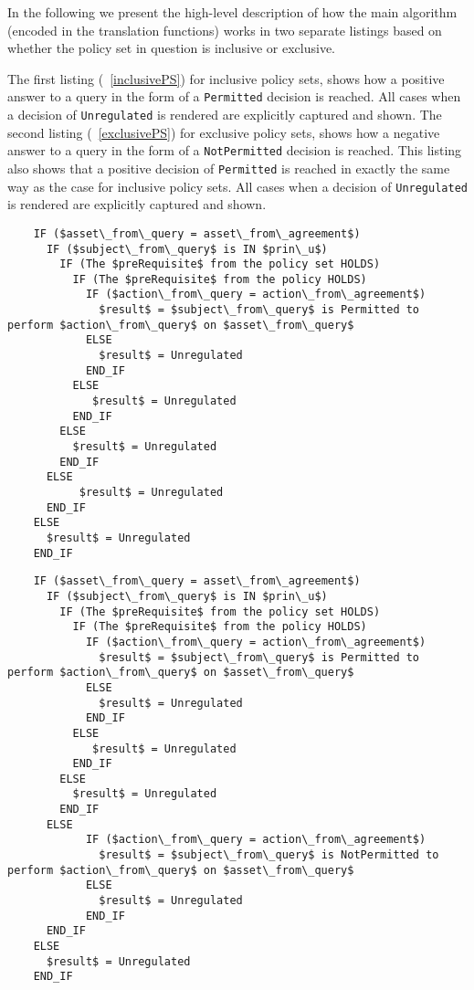 \documentclass[runningheads,a4paper]{llncs}
\newcommand{\syn}{\texttt}
\begin{document}
In the following we present the high-level description of how the main algorithm (encoded in the translation functions) works in two separate listings based on whether the policy set in question is inclusive or exclusive. 

The first listing (~\ref{inclusivePS}) for inclusive policy sets, shows how a positive answer to a query in the form of a \syn{Permitted} decision is reached. All cases when a decision of \syn{Unregulated} is rendered are explicitly captured and shown. The second listing (~\ref{exclusivePS}) for exclusive policy sets, shows how a negative answer to a query in the form of a \syn{NotPermitted} decision is reached. This listing also shows that a positive decision of \syn{Permitted} is reached in exactly the same way as the case for inclusive policy sets. All cases when a decision of \syn{Unregulated} is rendered are explicitly captured and shown.

\begin{lstlisting}
    IF ($asset\_from\_query = asset\_from\_agreement$)
      IF ($subject\_from\_query$ is IN $prin\_u$)
        IF (The $preRequisite$ from the policy set HOLDS)
          IF (The $preRequisite$ from the policy HOLDS)
            IF ($action\_from\_query = action\_from\_agreement$)
              $result$ = $subject\_from\_query$ is Permitted to perform $action\_from\_query$ on $asset\_from\_query$
            ELSE
              $result$ = Unregulated
            END_IF            
          ELSE
             $result$ = Unregulated
          END_IF
        ELSE
          $result$ = Unregulated
        END_IF
      ELSE
           $result$ = Unregulated
      END_IF
    ELSE
      $result$ = Unregulated
    END_IF
\end{lstlisting}

\begin{lstlisting}
    IF ($asset\_from\_query = asset\_from\_agreement$)
      IF ($subject\_from\_query$ is IN $prin\_u$)
        IF (The $preRequisite$ from the policy set HOLDS)
          IF (The $preRequisite$ from the policy HOLDS)
            IF ($action\_from\_query = action\_from\_agreement$)
              $result$ = $subject\_from\_query$ is Permitted to perform $action\_from\_query$ on $asset\_from\_query$
            ELSE
              $result$ = Unregulated
            END_IF            
          ELSE
             $result$ = Unregulated
          END_IF
        ELSE
          $result$ = Unregulated
        END_IF
      ELSE
            IF ($action\_from\_query = action\_from\_agreement$)
              $result$ = $subject\_from\_query$ is NotPermitted to perform $action\_from\_query$ on $asset\_from\_query$
            ELSE
              $result$ = Unregulated
            END_IF
      END_IF
    ELSE
      $result$ = Unregulated
    END_IF

\end{lstlisting}
\end{document}
